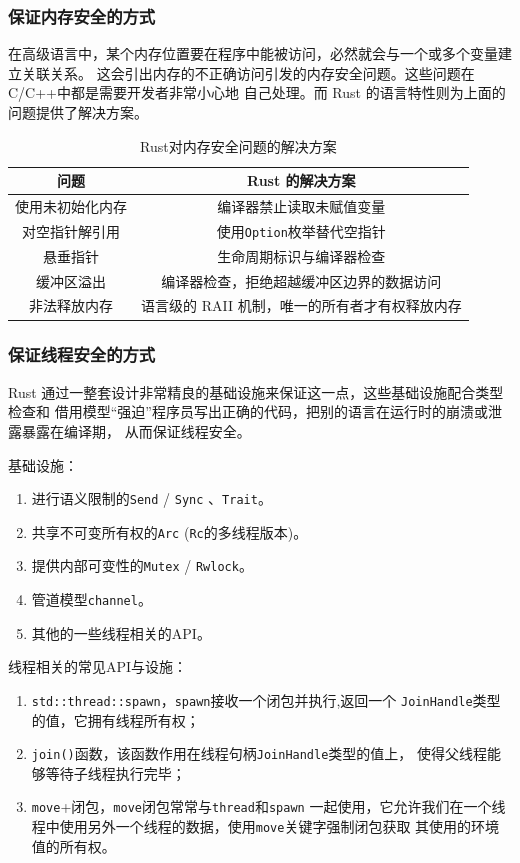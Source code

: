 \documentclass{../runikraft-report}
\begin{document}
\subsubsection{保证内存安全的方式}
在高级语言中，某个内存位置要在程序中能被访问，必然就会与一个或多个变量建立关联关系。
这会引出内存的不正确访问引发的内存安全问题。这些问题在C/C++中都是需要开发者非常小心地
自己处理。而 Rust 的语言特性则为上面的问题提供了解决方案。\cite{8}
\begin{table}[H]
\centering
\caption{Rust对内存安全问题的解决方案}
\begin{tabular}{|c|c|}
\hline
\textbf{问题} & \textbf{Rust 的解决方案}\\\hline
使用未初始化内存&编译器禁止读取未赋值变量\\\hline
对空指针解引用&使用\texttt{Option}枚举替代空指针\\\hline
悬垂指针&生命周期标识与编译器检查\\\hline
缓冲区溢出&编译器检查，拒绝超越缓冲区边界的数据访问\\\hline
非法释放内存&语言级的 RAII 机制，唯一的所有者才有权释放内存\\\hline
\end{tabular}
\end{table}
\subsubsection{保证线程安全的方式}
Rust 通过一整套设计非常精良的基础设施来保证这一点，这些基础设施配合类型检查和
借用模型“强迫”程序员写出正确的代码，把别的语言在运行时的崩溃或泄露暴露在编译期，
从而保证线程安全。

\noindent 基础设施：

\begin{enumerate}
\item 进行语义限制的\texttt{Send} / \texttt{Sync} 、\texttt{Trait}。
\item 共享不可变所有权的\texttt{Arc} (\texttt{Rc}的多线程版本)。
\item 提供内部可变性的\texttt{Mutex} / \texttt{Rwlock}。
\item 管道模型\texttt{channel}。
\item 其他的一些线程相关的API。
\end{enumerate}

\noindent 线程相关的常见API与设施：

\begin{enumerate}
\item \texttt{std::thread::spawn}，\texttt{spawn}接收一个闭包并执行,返回一个
\texttt{JoinHandle}类型的值，它拥有线程所有权；
\item  \texttt{join()}函数，该函数作用在线程句柄\texttt{JoinHandle}类型的值上，
使得父线程能够等待子线程执行完毕；
\item \texttt{move}+闭包，\texttt{move}闭包常常与\texttt{thread}和\texttt{spawn}
一起使用，它允许我们在一个线程中使用另外一个线程的数据，使用\texttt{move}关键字强制闭包获取
其使用的环境值的所有权。
\end{enumerate}
\end{document}
